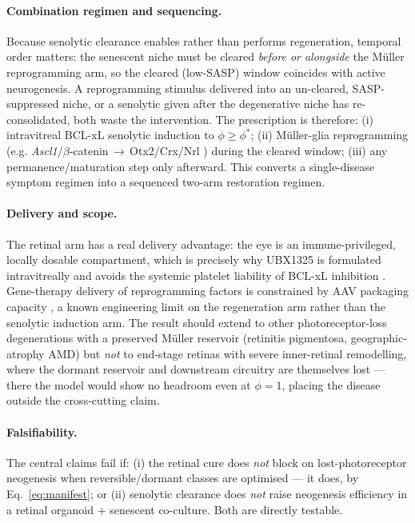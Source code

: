 \documentclass[11pt,a4paper]{article}
\begin{document}
\paragraph{Combination regimen and sequencing.} Because senolytic clearance enables rather than
performs regeneration, temporal order matters: the senescent niche must be cleared \emph{before or
alongside} the M\"uller reprogramming arm, so the cleared (low-SASP) window coincides with active
neurogenesis. A reprogramming stimulus delivered into an un-cleared, SASP-suppressed niche, or a
senolytic given after the degenerative niche has re-consolidated, both waste the intervention.
The prescription is therefore: (i) intravitreal BCL-xL senolytic induction to $\phi\geq\phi^\ast$;
(ii) M\"uller-glia reprogramming (e.g. \emph{Ascl1}/$\beta$-catenin\,$\to$\,Otx2/Crx/Nrl
\citep{jorstad2017,yao2018}) during the cleared window; (iii) any permanence/maturation step only
afterward. This converts a single-disease symptom regimen into a sequenced two-arm restoration
regimen.

\paragraph{Delivery and scope.} The retinal arm has a real delivery advantage: the eye is an
immune-privileged, locally dosable compartment, which is precisely why UBX1325 is formulated
intravitreally and avoids the systemic platelet liability of BCL-xL inhibition \citep{he2020}.
Gene-therapy delivery of reprogramming factors is constrained by AAV packaging capacity
\citep{wu2010}, a known engineering limit on the regeneration arm rather than the senolytic
induction arm. The result should extend to other photoreceptor-loss degenerations with a
preserved M\"uller reservoir (retinitis pigmentosa, geographic-atrophy AMD) but \emph{not} to
end-stage retinas with severe inner-retinal remodelling, where the dormant reservoir and downstream
circuitry are themselves lost --- there the model would show no headroom even at $\phi=1$, placing
the disease outside the cross-cutting claim.

\paragraph{Falsifiability.} The central claims fail if: (i) the retinal cure does \emph{not} block
on lost-photoreceptor neogenesis when reversible/dormant classes are optimised --- it does, by
Eq.~\eqref{eq:manifest}; or (ii) senolytic clearance does \emph{not} raise neogenesis efficiency
in a retinal organoid + senescent co-culture. Both are directly testable.
\end{document}
